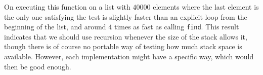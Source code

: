 On \sbcl{} executing this function on a list with $40000$ elements
where the last element is the only one satisfying the test is slightly
faster than an explicit loop from the beginning of the list, and
around $4$ times as fast as calling \texttt{find}.%
This result indicates that we should use recursion whenever the size
of the stack allows it, though there is of course no portable way of
testing how much stack space is available.  However, each
implementation might have a specific way, which would then be good
enough.
